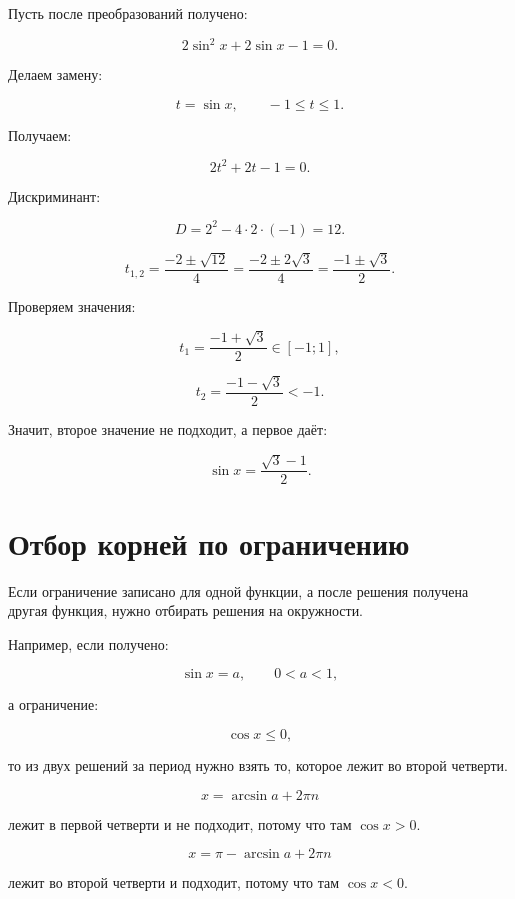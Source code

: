 \documentclass[a4paper,12pt]{article}
\begin{document}
Пусть после преобразований получено:

\[
2\sin^2x+2\sin x-1=0.
\]

Делаем замену:

\[
t=\sin x,\qquad -1\le t\le1.
\]

Получаем:

\[
2t^2+2t-1=0.
\]

Дискриминант:

\[
D=2^2-4\cdot2\cdot(-1)=12.
\]

\[
t_{1,2}=\frac{-2\pm\sqrt{12}}{4}
=\frac{-2\pm2\sqrt3}{4}
=\frac{-1\pm\sqrt3}{2}.
\]

Проверяем значения:

\[
t_1=\frac{-1+\sqrt3}{2}\in[-1;1],
\]

\[
t_2=\frac{-1-\sqrt3}{2}<-1.
\]

Значит, второе значение не подходит, а первое даёт:

\[
\sin x=\frac{\sqrt3-1}{2}.
\]

\section{Отбор корней по ограничению}

Если ограничение записано для одной функции, а после решения получена другая функция, нужно отбирать решения на окружности.

Например, если получено:

\[
\sin x=a,\qquad 0<a<1,
\]

а ограничение:

\[
\cos x\le0,
\]

то из двух решений за период нужно взять то, которое лежит во второй четверти.

\[
x=\arcsin a+2\pi n
\]

лежит в первой четверти и не подходит, потому что там \(\cos x>0\).

\[
x=\pi-\arcsin a+2\pi n
\]

лежит во второй четверти и подходит, потому что там \(\cos x<0\).

\begin{center}
\end{center}
\end{document}
